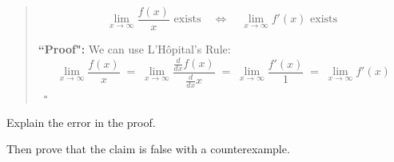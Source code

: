 \documentclass[12pt]{exam}
\begin{document}
\begin{enumerate}
\begin{enumerate}
\begin{quotation}
				$$  \lim_{x \to \infty} \frac{f(x)}{x} \mbox{ exists} \quad \iff \quad \lim_{x \to \infty} f'(x) \mbox{ exists } $$
				
				
				\noindent
				{\bf ``Proof":}  We can use L'H\^{o}pital's Rule:
					$$
						\lim_{x \to \infty} \frac{f(x)}{x} \; = \; \lim_{x \to \infty} \frac{\frac{d}{dx} f(x)}{\frac{d}{dx} x} 
							\; = \; \lim_{x \to \infty} \frac{f'(x)}{1} \; = \; \lim_{x \to \infty} f'(x)
					$$
					\ \hfill $\square$
			\end{quotation}
			Explain the  error in the proof.
			
			Then prove that the claim is false with a counterexample.
	\end{enumerate}

\end{enumerate}
\end{document}
